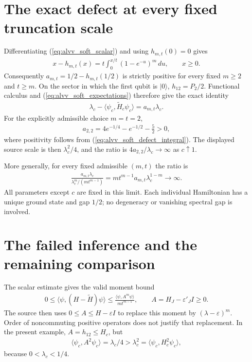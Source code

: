\documentclass{article}
\begin{document}
\section{The exact defect at every fixed truncation scale}

Differentiating (\ref{eq:alvv_soft_scalar}) and using $h_{m,t}(0)=0$ gives
\begin{align}
    x-h_{m,t}(x)
    =t\int_0^{x/t}(1-e^{-u})^m\,du,\qquad x\ge0.
    \label{eq:alvv_soft_defect_integral}
\end{align}
Consequently $a_{m,t}=1/2-h_{m,t}(1/2)$ is strictly positive for every
fixed $m\ge2$ and $t\ge m$. On the sector in which the first qubit is
$|0\rangle$, $h_{12}=P_2/2$. Functional calculus and
(\ref{eq:alvv_soft_expectations}) therefore give the exact identity
\begin{align}
    \lambda_c-\langle\psi_c,\widetilde H_c\psi_c\rangle
    =a_{m,t}\lambda_c.
    \label{eq:alvv_soft_exact_defect}
\end{align}
For the explicitly admissible choice $m=t=2$,
\begin{align}
    a_{2,2}=4e^{-1/4}-e^{-1/2}-\frac52>0,
    \label{eq:alvv_soft_small_scale}
\end{align}
where positivity follows from (\ref{eq:alvv_soft_defect_integral}).
The displayed source scale is then $\lambda_c^2/4$, and the ratio is
$4a_{2,2}/\lambda_c\to\infty$ as $c\uparrow1$.

More generally, for every fixed admissible $(m,t)$ the ratio is
\begin{align}
    \frac{a_{m,t}\lambda_c}{\lambda_c^m/(m t^{m-1})}
    =m t^{m-1}a_{m,t}\lambda_c^{1-m}\longrightarrow\infty.
    \label{eq:alvv_soft_divergence}
\end{align}
All parameters except $c$ are fixed in this limit. Each individual
Hamiltonian has a unique ground state and gap $1/2$; no degeneracy or
vanishing spectral gap is involved.

\section{The failed inference and the remaining comparison}

The scalar estimate gives the valid moment bound
\begin{align}
    0\le\langle\psi,(H-\widetilde H)\psi\rangle
    \le\frac{\langle\psi,A^m\psi\rangle}{m t^{m-1}},
    \qquad A=H_J-\varepsilon'_J I\ge0.
    \label{eq:alvv_soft_moment}
\end{align}
The source then uses $0\le A\le H-\varepsilon I$ to replace this
moment by $(\lambda-\varepsilon)^m$. Order of noncommuting positive
operators does not justify that replacement. In the present example,
$A=h_{12}\le H_c$, but
\begin{align}
    \langle\psi_c,A^2\psi_c\rangle=\lambda_c/4
    >\lambda_c^2=\langle\psi_c,H_c^2\psi_c\rangle,
    \label{eq:alvv_soft_failed_power_order}
\end{align}
because $0<\lambda_c<1/4$.
\end{document}

